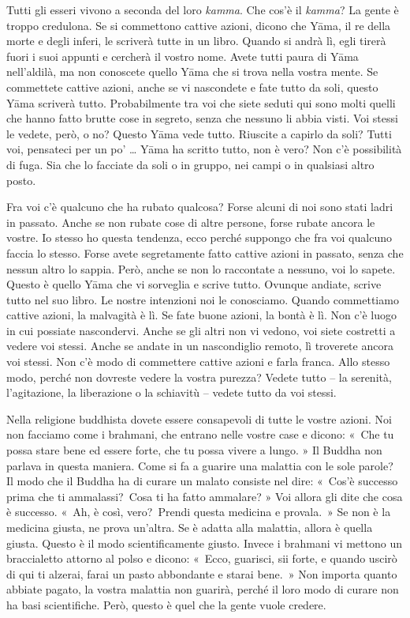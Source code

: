Tutti gli esseri vivono a seconda del loro \emph{kamma}. Che cos'è il
\emph{kamma}? La gente è troppo credulona. Se si commettono cattive
azioni, dicono che Yāma, il re della morte e degli inferi, le scriverà
tutte in un libro. Quando si andrà lì, egli tirerà fuori i suoi appunti
e cercherà il vostro nome. Avete tutti paura di Yāma nell'aldilà, ma non
conoscete quello Yāma che si trova nella vostra mente. Se commettete
cattive azioni, anche se vi nascondete e fate tutto da soli, questo Yāma
scriverà tutto. Probabilmente tra voi che siete seduti qui sono molti
quelli che hanno fatto brutte cose in segreto, senza che nessuno li
abbia visti. Voi stessi le vedete, però, o no? Questo Yāma vede tutto.
Riuscite a capirlo da soli? Tutti voi, pensateci per un po' \ldots{} Yāma ha
scritto tutto, non è vero? Non c'è possibilità di fuga. Sia che lo
facciate da soli o in gruppo, nei campi o in qualsiasi altro posto.

Fra voi c'è qualcuno che ha rubato qualcosa? Forse alcuni di noi sono
stati ladri in passato. Anche se non rubate cose di altre persone, forse
rubate ancora le vostre. Io stesso ho questa tendenza, ecco perché
suppongo che fra voi qualcuno faccia lo stesso. Forse avete segretamente
fatto cattive azioni in passato, senza che nessun altro lo sappia. Però,
anche se non lo raccontate a nessuno, voi lo sapete. Questo è quello
Yāma che vi sorveglia e scrive tutto. Ovunque andiate, scrive tutto nel
suo libro. Le nostre intenzioni noi le conosciamo. Quando commettiamo
cattive azioni, la malvagità è lì. Se fate buone azioni, la bontà è lì.
Non c'è luogo in cui possiate nascondervi. Anche se gli altri non vi
vedono, voi siete costretti a vedere voi stessi. Anche se andate in un
nascondiglio remoto, lì troverete ancora voi stessi. Non c'è modo di
commettere cattive azioni e farla franca. Allo stesso modo, perché non
dovreste vedere la vostra purezza? Vedete tutto -- la serenità,
l'agitazione, la liberazione o la schiavitù -- vedete tutto da voi
stessi.

Nella religione buddhista dovete essere consapevoli di tutte le vostre
azioni. Noi non facciamo come i brahmani, che entrano nelle vostre case
e dicono: «~Che tu possa stare bene ed essere forte, che tu possa vivere
a lungo. » Il Buddha non parlava in questa maniera. Come si fa a guarire
una malattia con le sole parole? Il modo che il Buddha ha di curare un
malato consiste nel dire: «~Cos'è successo prima che ti ammalassi?~Cosa
ti ha fatto ammalare? » Voi allora gli dite che cosa è successo. «~Ah, è
così, vero?~Prendi questa medicina e provala.~» Se non è la medicina
giusta, ne prova un'altra. Se è adatta alla malattia, allora è quella
giusta. Questo è il modo scientificamente giusto. Invece i brahmani vi
mettono un braccialetto attorno al polso e dicono: «~Ecco, guarisci, sii
forte, e quando uscirò di qui ti alzerai, farai un pasto abbondante e
starai bene.~» Non importa quanto abbiate pagato, la vostra malattia non
guarirà, perché il loro modo di curare non ha basi scientifiche. Però,
questo è quel che la gente vuole credere.

